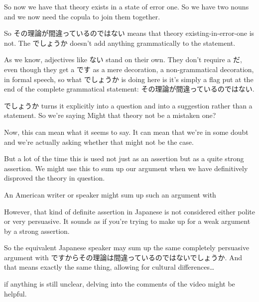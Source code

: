 So now we have that theory exists in a state of error one. So we have two nouns and we now need the copula to join them together.

{}

So その理論が間違っているのではない means that theory existing-in-error-one is not. The でしょうか doesn't add anything grammatically to the statement.

As we know, adjectives like ない stand on their own. They don't require a だ, even though they get a です as a mere decoration, a non-grammatical decoration, in formal speech, so what でしょうか is doing here is it's simply a flag put at the end of the complete grammatical statement: その理論が間違っているのではない.

でしょうか turns it explicitly into a question and into a suggestion rather than a statement. So we're saying Might that theory not be a mistaken one?

Now, this can mean what it seems to say. It can mean that we're in some doubt and we're actually asking whether that might not be the case.

But a lot of the time this is used not just as an assertion but as a quite strong assertion. We might use this to sum up our argument when we have definitively disproved the theory in question.

An American writer or speaker might sum up such an argument with 

However, that kind of definite assertion in Japanese is not considered either polite or very persuasive. It sounds as if you're trying to make up for a weak argument by a strong assertion.

So the equivalent Japanese speaker may sum up the same completely persuasive argument with ですからその理論は間違っているのではないでしょうか. And that means exactly the same thing, allowing for cultural differences\ldots{}

if anything is still unclear, delving into the comments of the video might be helpful.

{}

\stopsectionlevel
